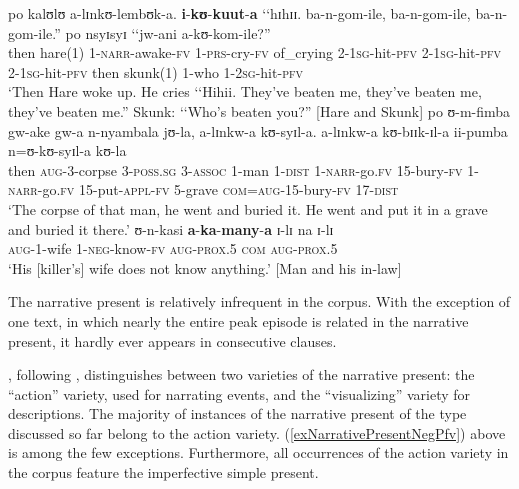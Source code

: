 \begin{exe}
\ex \label{exNarrativePresentPRS}
\gll po kalʊlʊ a-lɪnkʊ-lembʊk-a. \textbf{i}-\textbf{kʊ}-\textbf{kuut}-\textbf{a} \textup{\lq\lq}hɪhɪɪ. ba-n-gom-ile, ba-n-gom-ile, ba-n-gom-ile.\textup{''} po nsyɪsyɪ \textup{\lq\lq}jw-ani a-kʊ-kom-ile?\textup{''}\\
then hare(1) 1-\textsc{narr}-awake-\textsc{fv} 1-\textsc{prs}-cry-\textsc{fv} \phantom{\lq\lq}of\_crying 2-\textsc{1sg}-hit-\textsc{pfv} 2-\textsc{1sg}-hit-\textsc{pfv} 2-\textsc{1sg}-hit-\textsc{pfv} then skunk(1) \phantom{\lq\lq}1-who 1-\textsc{2sg}-hit-\textsc{pfv}\\
\glt \lq Then Hare woke up. He cries \lq\lq Hihii. They've beaten me, they've beaten me, they've beaten me.'' Skunk: \lq\lq Who's beaten you?'' [Hare and Skunk]
\ex \label{exNarrativePresentNegPfv}
\gll po ʊ-m-fimba gw-ake gw-a n-nyambala jʊ-la, a-lɪnkw-a kʊ-syɪl-a. a-lɪnkw-a kʊ-bɪɪk-ɪl-a ii-pumba n=ʊ-kʊ-syɪl-a kʊ-la\\
then \textsc{aug}-3-corpse 3-\textsc{poss.sg} 3-\textsc{assoc} 1-man 1-\textsc{dist} 1-\textsc{narr}-go.\textsc{fv} 15-bury-\textsc{fv} 1-\textsc{narr}-go.\textsc{fv} 15-put-\textsc{appl}-\textsc{fv} 5-grave \textsc{com}=\textsc{aug}-15-bury-\textsc{fv} 17-\textsc{dist}\\
\glt \lq The corpse of that man, he went and buried it. He went and put it in a grave and buried it there.'
\sn \gll ʊ-n-kasi \textbf{a}-\textbf{ka}-\textbf{many}-\textbf{a} ɪ-lɪ na ɪ-lɪ\\
 \textsc{aug}-1-wife 1-\textsc{neg}-know-\textsc{fv} \textsc{aug}-\textsc{prox.5} \textsc{com} \textsc{aug}-\textsc{prox.5}\\
\glt \lq His [killer's] wife does not know anything.' [Man and his in-law] 
\end{exe}

The narrative present is relatively infrequent in the corpus. With the exception of one text, in which nearly the entire peak episode is related in the narrative present, it hardly ever appears in consecutive clauses.

\citet{FleischmanS1990}, following \citet{BuffinJ1925}, distinguishes between two varieties of the narrative present: the ``action'' variety, used for narrating events, and the ``visualizing'' variety for descriptions. The majority of instances of the narrative present of the type discussed so far belong to the action variety. (\ref{exNarrativePresentNegPfv}) above is among the few exceptions. Furthermore, all occurrences of the action variety in the corpus feature the imperfective simple present.

